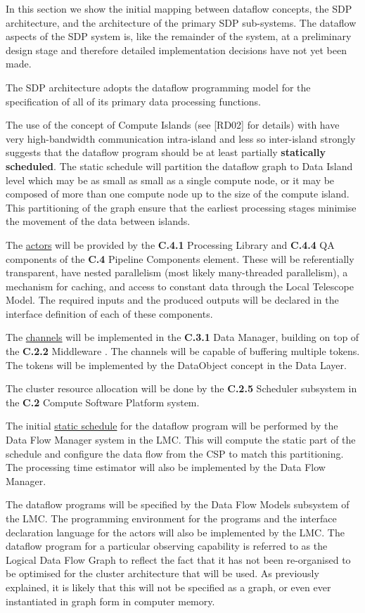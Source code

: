 \documentclass[11pt,a4paper]{article}
\begin{document}
In this section we show the initial mapping between dataflow concepts,
the SDP architecture, and the architecture of the primary SDP
sub-systems. The dataflow aspects of the SDP system is, like the
remainder of the system, at a preliminary design stage and therefore
detailed implementation decisions have not yet been made.

The SDP architecture adopts the dataflow programming model for the
specification of all of its primary data processing functions. 

The use of the concept of Compute Islands (see [RD02] for details)
with have very high-bandwidth communication intra-island and less so
inter-island strongly suggests that the dataflow program should be at
least partially {\bf statically scheduled}.  The static schedule will
partition the dataflow graph to Data Island level which may be as
small as small as a single compute node, or it may be composed of more
than one compute node up to the size of the compute island. This
partitioning of the graph ensure that the earliest processing stages
minimise the movement of the data between islands.

The \underline{actors} will be provided by the {\bf C.4.1} Processing
Library and {\bf C.4.4} QA components of the {\bf C.4} Pipeline
Components element. These will be referentially transparent, have
nested parallelism (most likely many-threaded parallelism), a
mechanism for caching, and access to constant data through the Local
Telescope Model. The required inputs and the produced outputs will be
declared in the interface definition of each of these components.

The \underline{channels} will be implemented in the {\bf C.3.1} Data
Manager, building on top of the {\bf C.2.2} Middleware . The channels
will be capable of buffering multiple tokens.  The tokens will be
implemented by the DataObject concept in the Data Layer.

The cluster resource allocation will be done by the {\bf C.2.5}
Scheduler subsystem in the {\bf C.2} Compute Software Platform system.

The initial \underline{static schedule} for the dataflow program will
be performed by the Data Flow Manager system in the LMC. This will
compute the static part of the schedule and configure the data flow
from the CSP to match this partitioning. The processing time estimator
will also be implemented by the Data Flow Manager.

The dataflow programs will be specified by the Data Flow Models
subsystem of the LMC.  The programming environment for the programs
and the interface declaration language for the actors will also be
implemented by the LMC.  The dataflow program for a particular
observing capability is referred to as the Logical Data Flow Graph to
reflect the fact that it has not been re-organised to be optimised for
the cluster architecture that will be used. As previously explained,
it is likely that this will not be specified as a graph, or even ever
instantiated in graph form in computer memory.
\end{document}
